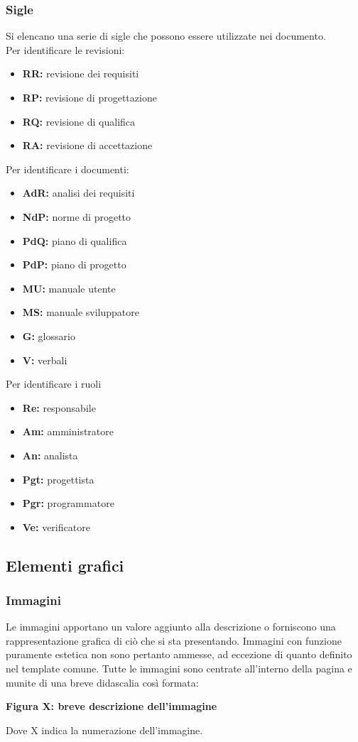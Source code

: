 \subsubsection{Sigle}
Si elencano una serie di sigle che possono essere utilizzate nei documento. 
\\
Per identificare le revisioni:
\begin{itemize}
\item \textbf{RR:} revisione dei requisiti
	\item \textbf{RP:} revisione di progettazione
	 	\item \textbf{RQ:} revisione di qualifica
			\item \textbf{RA:} revisione di accettazione
\end{itemize} 
Per identificare i documenti:
\begin{itemize}
\item \textbf{AdR:} analisi dei requisiti
	\item \textbf{NdP:} norme di progetto
		\item \textbf{PdQ:} piano di qualifica
			\item \textbf{PdP:} piano di progetto
				\item \textbf{MU:} manuale utente
					\item \textbf{MS:} manuale sviluppatore			
						\item \textbf{G:} glossario
							\item \textbf{V:} verbali
\end{itemize}
Per identificare i ruoli
\begin{itemize}
\item \textbf{Re:} responsabile
	\item \textbf{Am:} amministratore
		\item \textbf{An:} analista
			\item \textbf{Pgt:} progettista
				\item \textbf{Pgr:} programmatore
					\item \textbf{Ve:} verificatore
\end{itemize}
\subsection{Elementi grafici}
\subsubsection{Immagini}
Le immagini apportano un valore aggiunto alla descrizione o forniscono una rappresentazione grafica di ciò che si sta presentando. Immagini con funzione puramente estetica non sono pertanto ammesse, ad eccezione di quanto definito nel template comune. Tutte le immagini sono centrate all’interno della pagina e munite di una breve didascalia così formata:
\begin{center}
	\textbf {Figura X: breve descrizione dell'immagine}
\end{center}
Dove X indica la numerazione dell'immagine.
